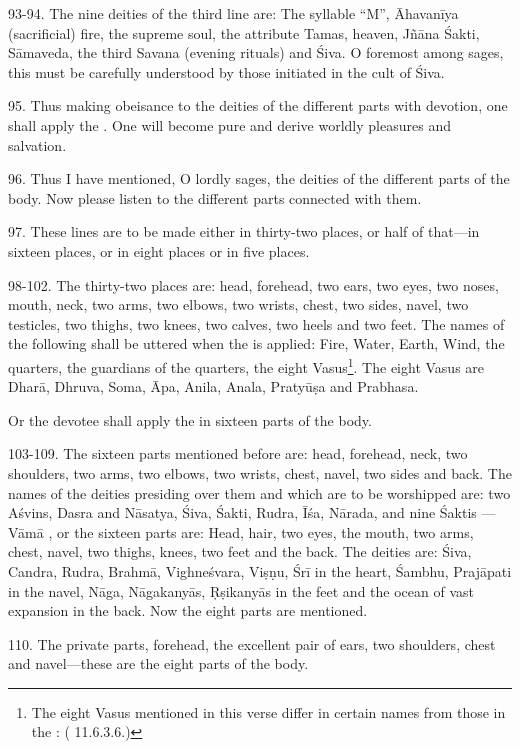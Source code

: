93-94. The nine deities of the third line are: The syllable “M”, Āhavanīya
(sacrificial) fire, the supreme soul, the attribute Tamas, heaven, Jñāna Śakti,
Sāmaveda, the third Savana (evening rituals) and Śiva. O foremost among sages,
this must be carefully understood by those initiated in the cult of Śiva.

95. Thus making obeisance to the deities of the different parts with devotion,
one shall apply the . One will become pure and derive worldly
pleasures and salvation.

96. Thus I have mentioned, O lordly sages, the deities of the different parts of
the body. Now please listen to the different parts connected with them.

97. These lines are to be made either in thirty-two places, or half of that—in
sixteen places, or in eight places or in five places.

98-102. The thirty-two places are: head, forehead, two ears, two eyes, two noses,
mouth, neck, two arms, two elbows, two wrists, chest, two sides, navel, two
testicles, two thighs, two knees, two calves, two heels and two feet. The names
of the following shall be uttered when the  is applied: Fire,
Water, Earth, Wind, the quarters, the guardians of the quarters, the eight
Vasus\footnote{The eight Vasus mentioned in this verse differ in certain names
from those in the :  (
11.6.3.6.)}. The eight Vasus are Dharā, Dhruva, Soma, Āpa, Anila, Anala,
Pratyūṣa and Prabhasa.

Or the devotee shall apply the  in sixteen parts of the body.

103-109. The sixteen parts mentioned before are: head, forehead, neck, two
shoulders, two arms, two elbows, two wrists, chest, navel, two sides and back.
The names of the deities presiding over them and which are to be worshipped are:
two Aśvins, Dasra and Nāsatya, Śiva, Śakti, Rudra, Īśa, Nārada, and nine Śaktis
—Vāmā \etc, or the sixteen parts are: Head, hair, two eyes, the mouth, two arms,
chest, navel, two thighs, knees, two feet and the back. The deities are: Śiva,
Candra, Rudra, Brahmā, Vighneśvara, Viṣṇu, Śrī in the heart, Śambhu, Prajāpati
in the navel, Nāga, Nāgakanyās, Ṛṣikanyās in the feet and the ocean of vast
expansion in the back. Now the eight parts are mentioned.

110. The private parts, forehead, the excellent pair of ears, two shoulders,
chest and navel—these are the eight parts of the body.

